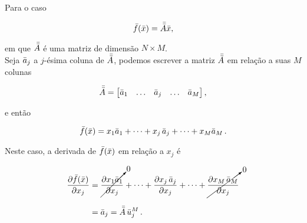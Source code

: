 \begin{example}
    Para o caso

    \begin{equation}
    \bar{f}(\bar{x}) = \bar{\bar{A}} \bar{x} ,
    \end{equation}

    \noindent em que $\bar{\bar{A}}$ é uma matriz de dimensão $N \times M$.
    \\
    \indent
    Seja $\bar{a}_j$ a $j$-ésima coluna de $\bar{\bar{A}}$, podemos escrever a matriz
    $\bar{\bar{A}}$ em relação a suas $M$ colunas

    \begin{equation}
    \bar{\bar{A}} =
        \begin{bmatrix}
        \bar{a}_1 & \ldots & \bar{a}_j & \ldots & \bar{a}_M
        \end{bmatrix} ,
    \end{equation}

    \noindent e então

    \begin{equation}
    \bar{f}(\bar{x}) = x_1\bar{a}_1 + \dotsb + x_j\thinspace\bar{a}_j +
    \dotsb + x_M\bar{a}_M \thinspace .
    \end{equation}

    \indent Neste caso, a derivada de  $\bar{f}(\bar{x})$ em relação
    a $x_j$ é
    
    \begin{equation}
    \begin{split}
    \dfrac{\partial \bar{f}(\bar{x})}{\partial x_j} &=
        \cancelto{0}{\dfrac{\partial x_1\bar{a}_1}{\partial x_j}} + \dotsb +
        \dfrac{\partial x_j\thinspace\bar{a}_j}{\partial x_j} + \dotsb +
        \cancelto{0}{\dfrac{\partial x_M\thinspace\bar{a}_M}{\partial x_j}}
    \\[0.3cm]
    &=
    \bar{a}_j = \bar{\bar{A}}\thinspace\bar{u}_j^M
    \thinspace .
    \end{split}
    \label{eq:deriv_Ax}
    \end{equation}
\end{example}


